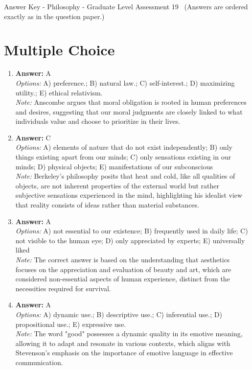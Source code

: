 \documentclass[12pt]{article}
\begin{document}
\begin{center}
Answer Key - Philosophy - Graduate Level Assessment 19 \
\small (Answers are ordered exactly as in the question paper.)
\end{center}

\section*{Multiple Choice}
\begin{enumerate}[label=\arabic*.]
\item \textbf{Answer:} A
\\ \textit{Options:} A) preference.; B) natural law.; C) self-interest.; D) maximizing utility.; E) ethical relativism.
\\ \textit{Note:} Anscombe argues that moral obligation is rooted in human preferences and desires, suggesting that our moral judgments are closely linked to what individuals value and choose to prioritize in their lives.
\item \textbf{Answer:} C
\\ \textit{Options:} A) elements of nature that do not exist independently; B) only things existing apart from our minds; C) only sensations existing in our minds; D) physical objects; E) manifestations of our subconscious
\\ \textit{Note:} Berkeley's philosophy posits that heat and cold, like all qualities of objects, are not inherent properties of the external world but rather subjective sensations experienced in the mind, highlighting his idealist view that reality consists of ideas rather than material substances.
\item \textbf{Answer:} A
\\ \textit{Options:} A) not essential to our existence; B) frequently used in daily life; C) not visible to the human eye; D) only appreciated by experts; E) universally liked
\\ \textit{Note:} The correct answer is based on the understanding that aesthetics focuses on the appreciation and evaluation of beauty and art, which are considered non-essential aspects of human experience, distinct from the necessities required for survival.
\item \textbf{Answer:} A
\\ \textit{Options:} A) dynamic use.; B) descriptive use.; C) inferential use.; D) propositional use.; E) expressive use.
\\ \textit{Note:} The word "good" possesses a dynamic quality in its emotive meaning, allowing it to adapt and resonate in various contexts, which aligns with Stevenson's emphasis on the importance of emotive language in effective communication.

\end{enumerate}
\end{document}
